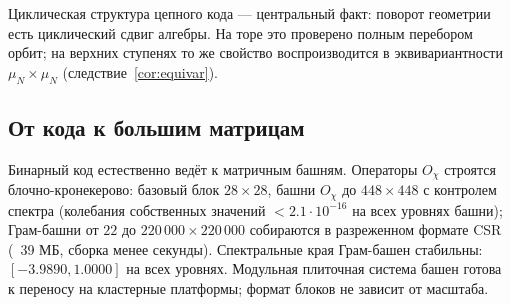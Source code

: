 Циклическая структура цепного кода — центральный факт: поворот
геометрии есть циклический сдвиг алгебры. На торе это проверено
полным перебором орбит; на верхних ступенях то же свойство
воспроизводится в эквивариантности $\mu_N\times\mu_N$
(следствие~\ref{cor:equivar}).

\subsection{От кода к большим матрицам}

Бинарный код естественно ведёт к матричным башням. Операторы
$O_\chi$ строятся блочно-кронекерово: базовый блок $28\times28$,
башни $O_\chi$ до $448\times448$ с контролем спектра (колебания
собственных значений $<2.1\cdot10^{-16}$ на всех уровнях башни);
Грам-башни от $22$ до $220\,000\times220\,000$ собираются в разреженном
формате CSR (~39 МБ, сборка менее секунды). Спектральные края
Грам-башен стабильны: $[-3.9890, 1.0000]$ на всех уровнях.
Модульная плиточная система башен готова к переносу на
кластерные платформы; формат блоков не зависит от масштаба.
